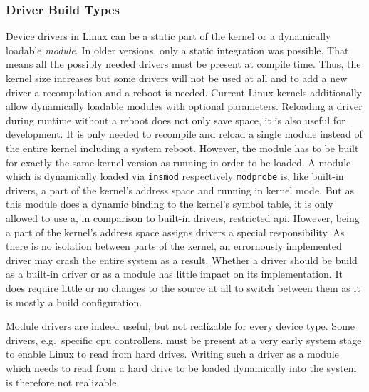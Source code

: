 \subsubsection*{Driver Build Types}
Device drivers in Linux can be a static part of the kernel or a dynamically loadable \textit{module}.
In older versions, only a static integration was possible. That means all the possibly needed drivers must be present at compile time.
Thus, the kernel size increases but some drivers will not be used at all and to add a new driver a recompilation and a reboot is needed.
Current Linux kernels additionally allow dynamically loadable modules with optional parameters.
Reloading a driver during runtime without a reboot does not only save space, it is also useful for development.
It is only needed to recompile and reload a single module instead of the entire kernel including a system reboot\cite{quade2016Linux}.
However, the module has to be built for exactly the same kernel version as running in order to be loaded.
A module which is dynamically loaded via \texttt{insmod} respectively \texttt{modprobe} is, like built-in drivers, a part of the kernel's address space and running in kernel mode.
But as this module does a dynamic binding to the kernel's symbol table, it is only allowed to use a, in comparison to built-in drivers, restricted \ac{api}\cite{glatz2015betriebssysteme}.
However, being a part of the kernel's address space assigns drivers a special responsibility.
As there is no isolation between parts of the kernel, an errornously implemented driver may crash the entire system as a result.
Whether a driver should be build as a built-in driver or as a module has little impact on its implementation.
It does require little or no changes to the source at all to switch between them as it is mostly a build configuration\cite{lfd430}.

Module drivers are indeed useful, but not realizable for every device type.
Some drivers, e.g.\ specific \ac{cpu} controllers, must be present at a very early system stage to enable Linux to read from hard drives.
Writing such a driver as a module which needs to read from a hard drive to be loaded dynamically into the system is therefore not realizable\cite{quade2016Linux}.

